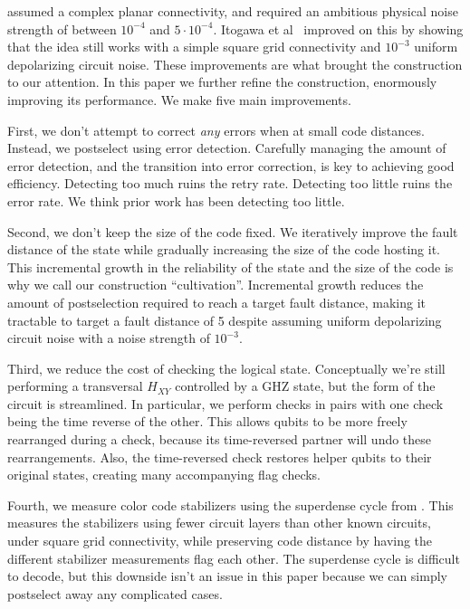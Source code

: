 \documentclass[onecolumn,unpublished,a4paper]{quantumarticle}
\theoremstyle{definition}
\begin{document}
\cite{chamberland2020colorinjection} assumed a complex planar connectivity, and required an ambitious physical noise strength of between $10^{-4}$ and $5 \cdot 10^{-4}$.
Itogawa et al~\cite{itogawa2024zeroleveldistilldistill} improved on this by showing that the idea still works with a simple square grid connectivity and $10^{-3}$ uniform depolarizing circuit noise.
These improvements are what brought the construction to our attention.
In this paper we further refine the construction, enormously improving its performance.
We make five main improvements.

First, we don't attempt to correct \emph{any} errors when at small code distances.
Instead, we postselect using error detection.
Carefully managing the amount of error detection, and the transition into error correction, is key to achieving good efficiency.
Detecting too much ruins the retry rate.
Detecting too little ruins the error rate.
We think prior work has been detecting too little.

Second, we don't keep the size of the code fixed.
We iteratively improve the fault distance of the state while gradually increasing the size of the code hosting it.
This incremental growth in the reliability of the state and the size of the code is why we call our construction ``cultivation''.
Incremental growth reduces the amount of postselection required to reach a target fault distance, making it tractable to target a fault distance of 5 despite assuming uniform depolarizing circuit noise with a noise strength of $10^{-3}$.

Third, we reduce the cost of checking the logical state.
Conceptually we're still performing a transversal $H_{XY}$ controlled by a GHZ state, but the form of the circuit is streamlined.
In particular, we perform checks in pairs with one check being the time reverse of the other.
This allows qubits to be more freely rearranged during a check, because its time-reversed partner will undo these rearrangements.
Also, the time-reversed check restores helper qubits to their original states, creating many accompanying flag checks.

Fourth, we measure color code stabilizers using the superdense cycle from \cite{gidney2023colorcode}.
This measures the stabilizers using fewer circuit layers than other known circuits, under square grid connectivity, while preserving code distance by having the different stabilizer measurements flag each other.
The superdense cycle is difficult to decode, but this downside isn't an issue in this paper because we can simply postselect away any complicated cases.
\end{document}
